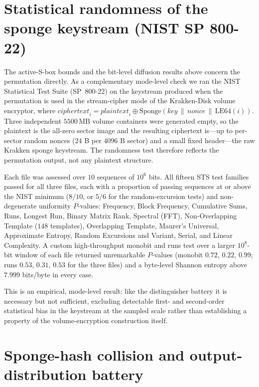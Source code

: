 \documentclass[11pt,a4paper]{article}
\begin{document}
\section{Statistical randomness of the sponge keystream (NIST SP 800-22)}
\label{sec:nist}

The active-S-box bounds and the bit-level diffusion results above concern the
permutation directly. As a complementary mode-level check we ran the NIST
Statistical Test Suite (SP~800-22) on the keystream produced when the permutation
is used in the stream-cipher mode of the Krakken-Disk volume encryptor, where
$\mathit{ciphertext}_i = \mathit{plaintext}_i \oplus
\mathrm{Sponge}(\mathit{key}\,\|\,\mathit{nonce}\,\|\,\mathrm{LE64}(i))$.
Three independent $5500$\,MB volume containers were generated empty, so the
plaintext is the all-zero sector image and the resulting ciphertext is---up to
per-sector random nonces ($24$ B per $4096$ B sector) and a small fixed
header---the raw Krakken sponge keystream. The randomness test therefore reflects
the permutation output, not any plaintext structure.

Each file was assessed over $10$ sequences of $10^{6}$ bits. All fifteen STS test
families passed for all three files, each with a proportion of passing sequences
at or above the NIST minimum ($8/10$, or $5/6$ for the random-excursion tests)
and non-degenerate uniformity $P$-values: Frequency, Block Frequency, Cumulative
Sums, Runs, Longest Run, Binary Matrix Rank, Spectral (FFT), Non-Overlapping
Template ($148$ templates), Overlapping Template, Maurer's Universal, Approximate
Entropy, Random Excursions and Variant, Serial, and Linear Complexity. A custom
high-throughput monobit and runs test over a larger $10^{8}$-bit window of each
file returned unremarkable $P$-values (monobit $0.72$, $0.22$, $0.99$; runs
$0.53$, $0.31$, $0.53$ for the three files) and a byte-level Shannon entropy
above $7.999$ bits/byte in every case.

This is an empirical, mode-level result: like the distinguisher battery it is
necessary but not sufficient, excluding detectable first- and second-order
statistical bias in the keystream at the sampled scale rather than establishing a
property of the volume-encryption construction itself.

\section{Sponge-hash collision and output-distribution battery}
\label{sec:collision}
\end{document}
